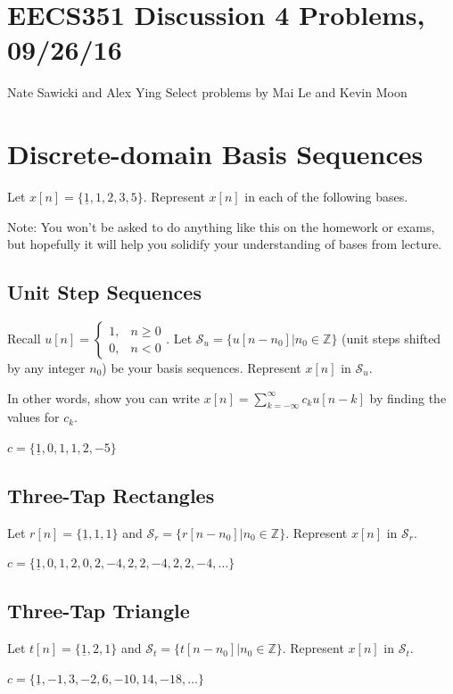 \documentclass[11pt]{article}
\begin{document}
\section*{EECS351 Discussion 4 Problems, 09/26/16}
Nate Sawicki and Alex Ying \newline
Select problems by Mai Le and Kevin Moon


\section{Discrete-domain Basis Sequences}
Let $x[n] = \{\underline{1},1,2,3,5\}$. Represent $x[n]$ in each of the following bases. 

Note: You won't be asked to do anything like this on the homework or exams, but hopefully it will help you solidify your understanding of bases from lecture.

\subsection*{Unit Step Sequences}
Recall $u[n] = \begin{cases}1, & n \geq 0\\ 0, & n < 0 \end{cases}$. Let $\mathcal{S}_u = \{u[n-n_0]|n_0 \in \mathbb{Z}\}$ (unit steps shifted by any integer $n_0$) be your basis sequences. Represent $x[n]$ in $\mathcal{S}_u$.

In other words, show you can write $x[n]=\sum\limits_{k=-\infty}^\infty c_k u[n-k]$ by finding the values for $c_k$.

{\color{blue}
$c = \{\underline{1}, 0, 1, 1, 2, -5\}$
}

\subsection*{Three-Tap Rectangles}
Let $r[n] = \{\underline{1},1,1\}$ and $\mathcal{S}_r = \{r[n-n_0]|n_0 \in \mathbb{Z}\}$. Represent $x[n]$ in $\mathcal{S}_r$.

{\color{blue}
$c = \{\underline{1}, 0, 1, 2, 0, 2, -4, 2, 2, -4, 2, 2, -4, \ldots \}$
}

\subsection*{Three-Tap Triangle}
Let $t[n] = \{\underline{1},2,1\}$ and $\mathcal{S}_t = \{t[n-n_0]|n_0 \in \mathbb{Z}\}$. Represent $x[n]$ in $\mathcal{S}_t$.

{\color{blue}
$c = \{\underline{1}, -1, 3, -2, 6, -10, 14, -18, \ldots \}$
}
\end{document}
